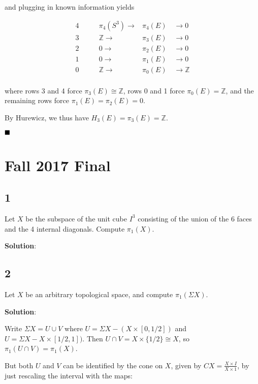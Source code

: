 and plugging in known information yields

\begin{align} 4\qquad &\pi_4(S^3) \to &\pi_4(E) \quad \to 0 \\ 3\qquad &{\mathbb{Z}}\to &\pi_3(E) \quad\to 0 \\ 2\qquad &0 \to &\pi_2(E) \quad\to 0 \\ 1\qquad &0 \to &\pi_1(E) \quad\to 0 \\ 0\qquad &{\mathbb{Z}}\to &\pi_0(E) \quad\to {\mathbb{Z}}\\ \end{align}

where rows 3 and 4 force \(\pi_3(E) \cong {\mathbb{Z}}\), rows 0 and 1
force \(\pi_0(E) = {\mathbb{Z}}\), and the remaining rows force
\(\pi_1(E) = \pi_2(E) = 0\).

By Hurewicz, we thus have \(H_3(E) = \pi_3(E) = {\mathbb{Z}}\).

\(\hfill\blacksquare\)

\hypertarget{fall-2017-final}{%
\section{Fall 2017 Final}\label{fall-2017-final}}

\hypertarget{section-14}{%
\subsection{1}\label{section-14}}

Let \(X\) be the subspace of the unit cube \(I^3\) consisting of the
union of the 6 faces and the 4 internal diagonals. Compute \(\pi_1(X)\).

\textbf{Solution}:

\hypertarget{section-15}{%
\subsection{2}\label{section-15}}

Let \(X\) be an arbitrary topological space, and compute
\(\pi_1(\Sigma X)\).

\textbf{Solution}:

Write \(\Sigma X = U \cup V\) where \(U = \Sigma X - (X\times[0,1/2])\)
and \(U = \Sigma X - X\times[1/2, 1])\). Then
\(U\cap V = X \times\{1/2\} \cong X\), so \(\pi_1(U\cap V) =\pi_1(X)\).

But both \(U\) and \(V\) can be identified by the cone on \(X\), given
by \(CX = \frac{X \times I}{X \times 1}\), by just rescaling the
interval with the maps:

